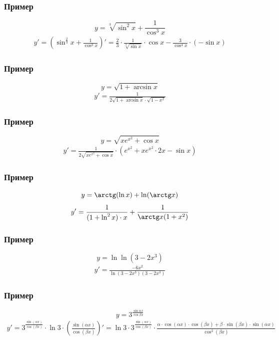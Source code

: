 \documentclass{article}
\begin{document}
\subsubsection{Пример}
\[
    y = \sqrt[3]{\sin^2 x} + \frac{1}{\cos^3 x}
\]
\begin{gather*}
    y' = \left( \sin^{\frac{2}{3}} x + \frac{1}{\cos^3 x} \right)' = 
    \frac{2}{3} \cdot \frac{1}{\sqrt[3]{\sin x}} \cdot \cos x - \frac{3}{\cos^4 x} \cdot (-\sin x)
\end{gather*}

\subsubsection{Пример}
\[
    y = \sqrt{1 + \arcsin x}
\]
\begin{gather*}
    y' = \frac{1}{2 \sqrt{1 + \arcsin x} \cdot \sqrt{1 - x^2}}    
\end{gather*}

\subsubsection{Пример}
\[
    y = \sqrt{xe^{x^2} + \cos x}
\]
\begin{gather*}
    y' = \frac{1}{2 \sqrt{xe^{x^2} + \cos x}} \cdot \left( e^{x^2} + xe^{x^2} \cdot 2x - \sin x \right)
\end{gather*}

\subsubsection{Пример}
\[
    y = \arctg(\ln x) + \ln(\arctg x)
\]
\begin{gather*}
    y' = \frac{1}{(1 + \ln^2 x) \cdot x} + \frac{1}{\arctg x (1 + x^2)}
\end{gather*}

\subsubsection{Пример}
\[
    y = \ln \ln(3 - 2x^3)
\]
\begin{gather*}
    y' = \frac{-6x^2}{\ln(3 - 2x^3)(3 - 2x^3)}
\end{gather*}

\subsubsection{Пример}
\[
    y = 3^{\frac{\sin \alpha x}{\cos \beta x}}
\]
\begin{gather*}
    y' = 3^{\frac{\sin (\alpha x)}{\cos (\beta x)}} \cdot \ln 3 \cdot \left( \frac{\sin (\alpha x)}{\cos (\beta x)} \right)' =
    \ln 3 \cdot 3^{\frac{\sin (\alpha x)}{\cos (\beta x)}} \cdot 
    \frac{\alpha \cdot \cos (\alpha x) \cdot \cos (\beta x) + \beta \cdot \sin (\beta x) \cdot \sin (\alpha x)}{\cos^2 (\beta x)}
\end{gather*}
\end{document}
